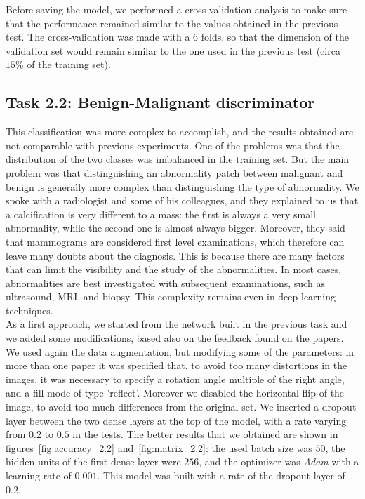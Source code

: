 \documentclass[11pt,a4paper,oneside]{article}
\begin{document}
Before saving the model, we performed a cross-validation analysis to make sure that the performance remained similar to the values obtained in the previous test. The cross-validation was made with a $6$ folds, so that the dimension of the validation set would remain similar to the one used in the previous test (circa $15\%$ of the training set).


\clearpage

\subsection{Task 2.2: Benign-Malignant discriminator}
This classification was more complex to accomplish, and the results obtained are not comparable with previous experiments. One of the problems was that the distribution of the two classes was imbalanced in the training set. But the main problem was that distinguishing an abnormality patch between malignant and benign is generally more complex than distinguishing the type of abnormality. 
We spoke with a radiologist and some of his colleagues, and they explained to us that a calcification is very different to a mass: the first is always a very small abnormality, while the second one is almost always bigger. Moreover, they said that mammograms are considered first level examinations, which therefore can leave many doubts about the diagnosis. This is because there are many factors that can limit the visibility and the study of the abnormalities. 
In most cases, abnormalities are best investigated with subsequent examinations, such as ultrasound, MRI, and biopsy.
This complexity remains even in deep learning techniques.\\


As a first approach, we started from the network built in the previous task and we added some modifications, based also on the feedback found on the papers.
We used again the data augmentation, but modifying some of the parameters: in more than one paper it was specified that, to avoid too many distortions in the images, it was necessary to specify a rotation angle multiple of the right angle, and a fill mode of type 'reflect'. Moreover we disabled the horizontal flip of the image, to avoid too much differences from the original set.
We inserted a dropout layer between the two dense layers at the top of the model, with a rate varying from $0.2$ to $0.5$ in the tests.
The better results that we obtained are shown in figures~\ref{fig:accuracy_2.2} and~\ref{fig:matrix_2.2}: the used batch size was $50$, the hidden units of the first dense layer were $256$, and the optimizer was \textit{Adam} with a learning rate of $0.001$. This model was built with a rate of the dropout layer of $0.2$.
\end{document}
